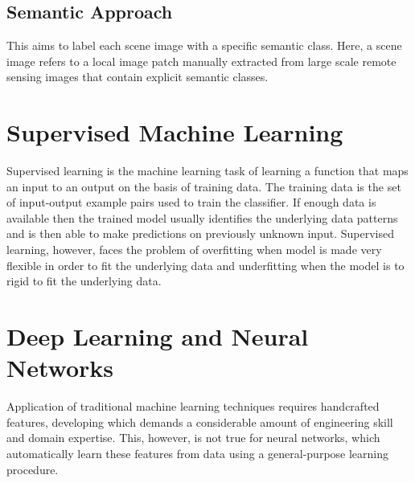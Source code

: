 \documentclass[12pt, a4paper]{report}
\begin{document}
\subsection{Semantic Approach}
This aims to label each scene image with a specific semantic class. Here, a scene image refers to a local image patch manually extracted from large scale remote sensing images that contain explicit semantic classes.\cite{eyesky}

\section{Supervised Machine Learning}
Supervised learning is the machine learning task of learning a function that maps an input to an output on the basis of training data.\cite{supervisedlearningone, supervisedlearningtwo} The training data is the set of input-output example pairs used to train the classifier. If enough data is available then the trained model usually identifies the underlying data patterns and is then able to make predictions on previously unknown input. Supervised learning, however, faces the problem of overfitting when model is made very flexible in order to fit the underlying data and underfitting when the model is to rigid to fit the underlying data.

\newpage
\section{Deep Learning and Neural Networks}
Application of traditional machine learning techniques requires handcrafted features, developing which demands a considerable amount of engineering skill and domain expertise. This, however, is not true for neural networks, which automatically learn these features from data using a general-purpose learning procedure.\cite{eyesky, cs231n} 
\end{document}
